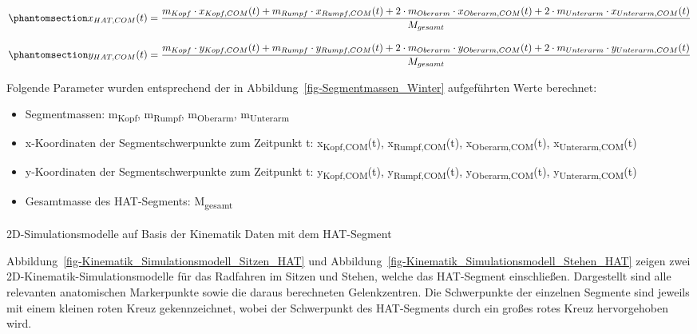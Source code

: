 \documentclass[
  letterpaper,
  DIV=11]{scrartcl}
\makeatletter
\let\oldparagraph\paragraph
\renewcommand{\paragraph}{
    \@ifstar
      \xxxParagraphStar
      \xxxParagraphNoStar
  }
\newcommand{\xxxParagraphStar}[1]{\oldparagraph*{#1}\mbox{}}
\newcommand{\xxxParagraphNoStar}[1]{\oldparagraph{#1}\mbox{}}
\providecommand{\tightlist}{%
  \setlength{\itemsep}{0pt}\setlength{\parskip}{0pt}}\usepackage{longtable,booktabs,array}
\makeatother
\begin{document}
\begin{equation}\phantomsection\label{eq-X_HAT_COM}{
x_{HAT,COM}(t) = \frac{m_{Kopf} \cdot x_{Kopf,COM}(t) + m_{Rumpf} \cdot x_{Rumpf,COM}(t) + 2 \cdot m_{Oberarm} \cdot x_{Oberarm,COM}(t) + 2 \cdot m_{Unterarm} \cdot x_{Unterarm,COM}(t)}{M_{gesamt}}
}\end{equation}

\begin{equation}\phantomsection\label{eq-Y_HAT_COM}{
y_{HAT,COM}(t) = \frac{m_{Kopf} \cdot y_{Kopf,COM}(t) + m_{Rumpf} \cdot y_{Rumpf,COM}(t) + 2 \cdot m_{Oberarm} \cdot y_{Oberarm,COM}(t) + 2 \cdot m_{Unterarm} \cdot y_{Unterarm,COM}(t)}{M_{gesamt}}
}\end{equation}

Folgende Parameter wurden entsprechend der in
Abbildung~\ref{fig-Segmentmassen_Winter} aufgeführten Werte berechnet:

\begin{itemize}
\tightlist
\item
  Segmentmassen: m\textsubscript{Kopf}, m\textsubscript{Rumpf},
  m\textsubscript{Oberarm}, m\textsubscript{Unterarm}
\item
  x-Koordinaten der Segmentschwerpunkte zum Zeitpunkt t:
  x\textsubscript{Kopf,COM}(t), x\textsubscript{Rumpf,COM}(t),
  x\textsubscript{Oberarm,COM}(t), x\textsubscript{Unterarm,COM}(t)
\item
  y-Koordinaten der Segmentschwerpunkte zum Zeitpunkt t:
  y\textsubscript{Kopf,COM}(t), y\textsubscript{Rumpf,COM}(t),
  y\textsubscript{Oberarm,COM}(t), y\textsubscript{Unterarm,COM}(t)
\item
  Gesamtmasse des HAT-Segments: M\textsubscript{gesamt}
\end{itemize}

\paragraph{2D-Simulationsmodelle auf Basis der Kinematik Daten mit dem
HAT-Segment}\label{d-simulationsmodelle-auf-basis-der-kinematik-daten-mit-dem-hat-segment}

Abbildung~\ref{fig-Kinematik_Simulationsmodell_Sitzen_HAT} und
Abbildung~\ref{fig-Kinematik_Simulationsmodell_Stehen_HAT} zeigen zwei
2D-Kinematik-Simulationsmodelle für das Radfahren im Sitzen und Stehen,
welche das HAT-Segment einschließen. Dargestellt sind alle relevanten
anatomischen Markerpunkte sowie die daraus berechneten Gelenkzentren.
Die Schwerpunkte der einzelnen Segmente sind jeweils mit einem kleinen
roten Kreuz gekennzeichnet, wobei der Schwerpunkt des HAT-Segments durch
ein großes rotes Kreuz hervorgehoben wird.
\end{document}
